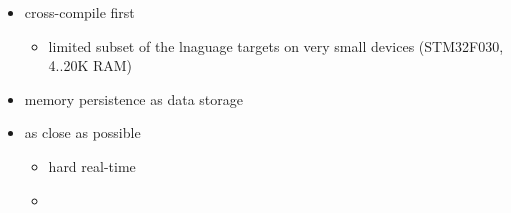 \label{princ}

\begin{itemize}
    \item cross-compile first
    \begin{itemize}
        \item limited subset of the lnaguage targets on very small devices
        (STM32F030, 4..20K RAM)
    \end{itemize}
    \item memory persistence as data storage
    \item as close as possible
    \begin{itemize}
        \item hard real-time
        \item 
    \end{itemize}
\end{itemize}
